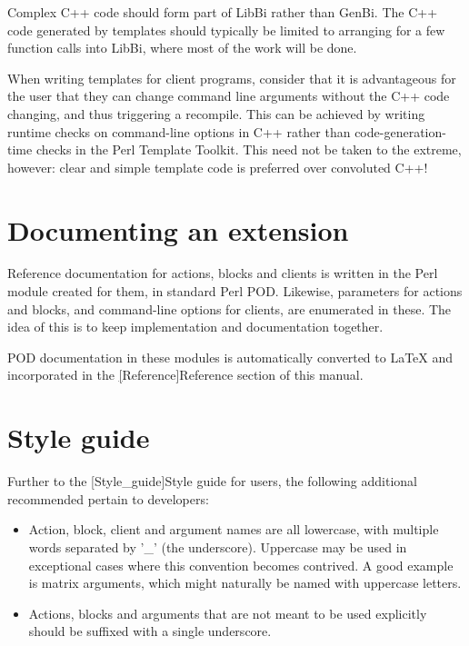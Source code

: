 Complex C++ code should form part of LibBi rather than GenBi. The C++ code
generated by templates should typically be limited to arranging for a few
function calls into LibBi, where most of the work will be done.

When writing templates for client programs, consider that it is advantageous
for the user that they can change command line arguments without the C++ code
changing, and thus triggering a recompile. This can be achieved by writing
runtime checks on command-line options in C++ rather than code-generation-time
checks in the Perl Template Toolkit. This need not be taken to the extreme,
however: clear and simple template code is preferred over convoluted C++!

\section{Documenting an extension\label{Documenting_an_extension}}

Reference documentation for actions, blocks and clients is written in the Perl
module created for them, in standard Perl POD. Likewise, parameters for
actions and blocks, and command-line options for clients, are enumerated in
these. The idea of this is to keep implementation and documentation together.

POD documentation in these modules is automatically converted to LaTeX and
incorporated in the \hyperref[hyper][Reference]{Reference} section of this
manual.

\section{Style guide\label{Developer_style_guide}}

Further to the \hyperref[hyper][Style_guide]{Style guide} for users, the
following additional recommended pertain to developers:
\begin{itemize}
\item Action, block, client and argument names are all lowercase, with
  multiple words separated by '\_' (the underscore). Uppercase may be used in
  exceptional cases where this convention becomes contrived. A good example is
  matrix arguments, which might naturally be named with uppercase letters.
\item Actions, blocks and arguments that are not meant to be used explicitly
  should be suffixed with a single underscore.
\end{itemize}

